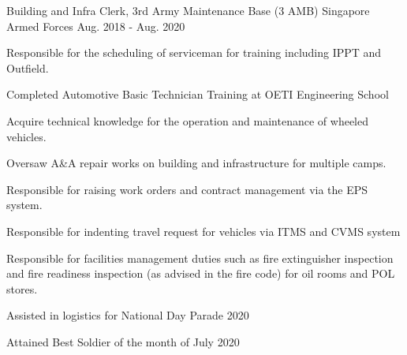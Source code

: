 

\begin{cventries}

  \cventry
    {Building and Infra Clerk, 3rd Army Maintenance Base (3 AMB)} %
    {Singapore Armed Forces} %
    {Aug. 2018 - Aug. 2020} %
    {} %
    {
      \begin{cvitems} %
        \item {Responsible for the scheduling of serviceman for training including IPPT and Outfield.}
        \item {Completed Automotive Basic Technician Training at OETI Engineering School}
        \item {Acquire technical knowledge for the operation and maintenance of wheeled vehicles.}
        \item {Oversaw A\&A repair works on building and infrastructure for multiple camps.}
        \item {Responsible for raising work orders and contract management via the EPS system.}
        \item {Responsible for indenting travel request for vehicles via ITMS and CVMS system}
        \item {Responsible for facilities management duties such as fire extinguisher inspection and fire readiness inspection (as advised in the fire code) for oil rooms and POL stores.}
        \item {Assisted in logistics for National Day Parade 2020}
        \item {Attained Best Soldier of the month of July 2020}
      \end{cvitems}
    }

\end{cventries}
